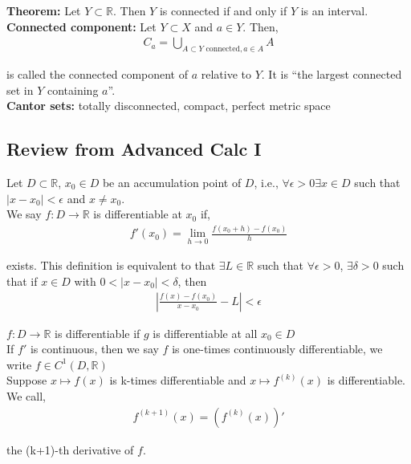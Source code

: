 \documentclass[12pt]{article}
\begin{document}
\textbf{Theorem:} Let $Y \subset \mathbb{R}$. Then $Y$ is connected if and only if $Y$ is an interval.\\

\textbf{Connected component:} Let $Y \subset X$ and $a \in Y$. Then,
\begin{align*}
C_a = \bigcup_{A \subset Y \text{ connected}, a \in A} A
\end{align*}

is called the connected component of $a$ relative to $Y$. It is ``the largest connected set in $Y$ containing $a$''.\\

\textbf{Cantor sets:} totally disconnected, compact, perfect metric space

\subsection{Review from Advanced Calc I}

Let $D \subset \mathbb{R}$, $x_0 \in D$ be an accumulation point of $D$, i.e., $\forall \epsilon > 0 \exists x \in D$ such that $|x - x_0| < \epsilon$ and $x \neq x_0$.\\

We say $f: D \to \mathbb{R}$ is differentiable at $x_0$ if,
\begin{align*}
f'(x_0) = \lim_{h \to 0} \frac{f(x_0 + h) - f(x_0)}{h}
\end{align*}

exists. This definition is equivalent to that $\exists L \in \mathbb{R}$ such that $\forall \epsilon > 0$, $\exists \delta > 0$ such that if $x \in D$ with $0 < |x - x_0| < \delta$, then 
\begin{align*}
\left | \frac{f(x) - f(x_0)}{x - x_0} - L \right | < \epsilon
\end{align*}

$f: D \to \mathbb{R}$ is differentiable if $g$ is differentiable at all $x_0 \in D$\\

If $f'$ is continuous, then we say $f$ is one-times continuously differentiable, we write $f \in C^1(D, \mathbb{R})$\\

Suppose $x \mapsto f(x)$ is k-times differentiable and $x \mapsto f^{(k)}(x)$ is differentiable. We call,
\begin{align*}
f^{(k+1)}(x) = \left(f^{(k)}(x) \right)'
\end{align*}

the (k+1)-th derivative of $f$.\\
\end{document}
